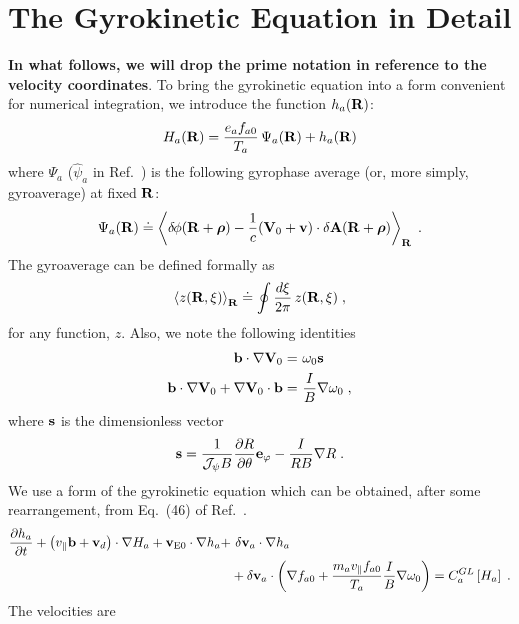 \section{The Gyrokinetic Equation in Detail}

{\bf In what follows, we will drop the prime notation in reference 
to the velocity coordinates}. To bring the gyrokinetic equation into 
a form convenient for numerical integration, we introduce the 
function $h_a(\mathbf{R})$:
%
\begin{equation}
H_a(\mathbf{R}) = \frac{e_a f_{a0}}{T_a} \, \Psi_a(\mathbf{R}) + h_a(\mathbf{R})
\label{eq.bigh}
\end{equation}
%
where $\Psi_a$ (${\hat\psi}_a$ in Ref.~\cite{sugama:1998}) is the 
following gyrophase average (or, more simply, gyroaverage) at 
fixed $\mathbf{R}$:
%
\begin{equation}
\Psi_a(\mathbf{R}) \doteq \left< 
\delta \hskip -1pt \phi(\mathbf{R}+\boldsymbol{\rho})-\frac{1}{c}({\bf V}_0 + \mathbf{v}) \cdot 
\delta {\bf A}(\mathbf{R}+\boldsymbol{\rho}) \right>_{\mathbf{R}} \; .
\label{eq.bigpsi}
\end{equation}
%
The gyroaverage can be defined formally as
%
\begin{equation}
\left< z(\mathbf{R},\xi) \right>_{\mathbf{R}} \doteq \oint \frac{d\xi}{2\pi} \, z(\mathbf{R},\xi) \; ,
\label{eq.gyroav}
\end{equation}
%
for any function, $z$.    Also, we note 
the following identities 
%
\begin{align}
\mathbf{b} \cdot\nabla \mathbf{V}_0 = &~\omega_0 \mathbf{s} \\
\mathbf{b} \cdot\nabla \mathbf{V}_0 + \nabla \mathbf{V}_0 \cdot \mathbf{b} = &~ 
 \frac{I}{B} \nabla \omega_0 \; ,
\end{align}
%
where $\mathbf{s}$ is the dimensionless vector 
%
\begin{equation}
\mathbf{s} = \frac{1}{\mathcal{J_\psi} B} \frac{\partial R}{\partial\theta} \mathbf{e}_\varphi 
- \frac{I}{RB} \nabla R \; .
\end{equation}
%
We use a form of the gyrokinetic equation which can be obtained, 
after some rearrangement, from Eq.~(46) of Ref.~\cite{sugama:1998}.
%
\begin{align}
\frac{\partial h_a}{\partial t} + \left( v_\parallel \mathbf{b} + \mathbf{v}_d \right)
\cdot\nabla H_a + \mathbf{v}_{\rm E0} \cdot \nabla h_a 
+ &~\delta {\bf v}_a \cdot \nabla h_a \nonumber\\
& + \delta {\bf v}_a \cdot \left( \nabla f_{a0} + 
 \frac{m_a v_\parallel f_{a0}}{T_a} \frac{I}{B} \nabla \omega_0 \right) 
 = C_a^{GL}\left[ H_a \right] \; .
\label{eq.gkraw}
\end{align}
%
The velocities are  
